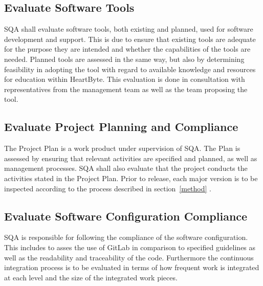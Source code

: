 \documentclass{article}
\begin{document}
	\subsection{Evaluate Software Tools}
	SQA shall evaluate software tools, both existing and planned, used for software development and support. This is due to ensure that existing tools are adequate for the purpose they are intended and whether the capabilities of the tools are needed. Planned tools are assessed in the same way, but also by determining feasibility in adopting the tool with regard to available knowledge and resources for education within HeartByte. This evaluation is done in consultation with representatives from the management team as well as the team proposing the tool.
	
	\subsection{Evaluate Project Planning and Compliance}
	The Project Plan is a work product under supervision of SQA. The Plan is assessed by ensuring that relevant activities are specified and planned, as well as management processes. SQA shall also evaluate that the project conducts the activities stated in the Project Plan. Prior to release, each major version is to be inspected according to the process described in  section~\ref{method} . 
	
	
	
	\subsection{Evaluate Software Configuration Compliance}
	SQA is responsible for following the compliance of the software configuration. This includes to asses the use of GitLab in comparison to specified guidelines as well as the readability and traceability of the code. Furthermore the continuous integration process is to be evaluated in terms of how frequent work is integrated at each level and the size of the integrated work pieces.
	
\end{document}
